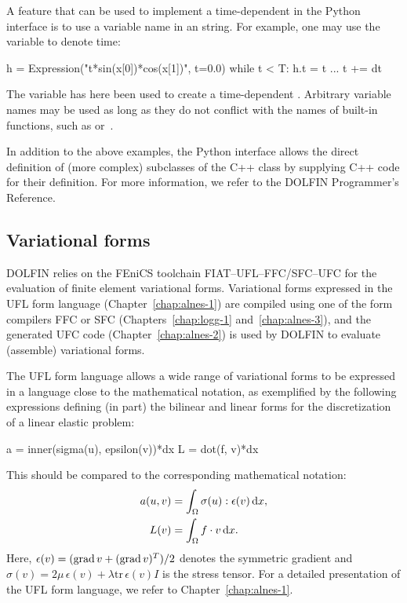 \enlargethispage{12pt}

A feature that can be used to implement a time-dependent 
in the Python interface is to use a variable name in an 
string.  For example, one may use the variable  to denote time:
\begin{python}
h = Expression("t*sin(x[0])*cos(x[1])", t=0.0)
while t < T:
    h.t = t
    ...
    t += dt
\end{python}
The  variable has here been used to create a time-dependent
. Arbitrary variable names may be used as long as they
do not conflict with the names of built-in functions, such as 
or~.

In addition to the above examples, the Python interface allows
the direct definition of (more complex) subclasses of the C++
 class by supplying C++ code for their definition. For
more information, we refer to the DOLFIN Programmer's Reference.

\subsection{Variational forms}

DOLFIN relies on the FEniCS toolchain FIAT--UFL--FFC/SFC--UFC for the
evaluation of finite element variational forms. Variational forms
expressed in the UFL form language (Chapter~\ref{chap:alnes-1})
are compiled using one of the form compilers FFC or SFC
(Chapters~\ref{chap:logg-1} and~\ref{chap:alnes-3}), and the generated
UFC code (Chapter~\ref{chap:alnes-2}) is used by DOLFIN to
evaluate (assemble) variational forms.

The UFL form language allows a wide range of variational forms to be
expressed in a language close to the mathematical notation, as exemplified
by the following expressions defining (in part) the bilinear and linear
forms for the discretization of a linear elastic problem:
\begin{uflcode}
a = inner(sigma(u), epsilon(v))*dx
L = dot(f, v)*dx
\end{uflcode}
This should be compared to the corresponding mathematical notation:
\begin{align} \label{eq:logg-2:elasticity1}
  a(u, v) &= \int_{\Omega} \sigma(u) : \epsilon(v) \, \mathrm{d}x,
\\
  L(v)    &= \int_{\Omega} f \cdot v \, \mathrm{d}x.
\end{align}
Here, $\epsilon(v) = (\operatorname{grad} v + (\operatorname{grad} v)^{T}) / 2$ denotes the
symmetric gradient and $\sigma(v) = 2 \mu \, \epsilon(v) + \lambda
\mathrm{tr} \, \epsilon(v) I$ is the stress tensor. For a detailed
presentation of the UFL form language, we refer to
Chapter~\ref{chap:alnes-1}.

